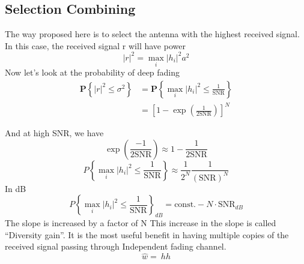\subsection{Selection Combining}
The way proposed here is to select the antenna with the highest received signal.
In this case, the received signal r will have power
\[|r|^2= \max_i{|h_i|^2 a^2}\]
Now let's look at the probability of deep fading
\begin{equation}
    \label{eq:p of deep fading in SIMO}
    \begin{aligned}
        \mathbf{P}\left\{|r|^2 \leq \sigma^2 \right\} &= \mathbf{P}\left\{\max_i{|h_i|^2 \leq \frac{1}{\text{SNR}}}\right\} \\
        & =\left[1- \exp \left( \frac{1}{2\text{SNR}} \right) \right]^N
    \end{aligned}
\end{equation}

And at high SNR, we have 
\[\exp \left( \frac{-1}{2\text{SNR}} \right) \approx 1-\frac{1}{2\text{SNR}}\]
\[P\left\{\max_i{\left|h_i\right|^2\le\frac{1}{\text{SNR}}}\right\}\approx\frac{1}{2^N}\frac{1}{\left(\text{SNR}\right)^N}\]
In dB 
\[P\left\{\max_i{\left|h_i\right|^2\le\frac{1}{\text{SNR}}}\right\}_{dB}= \text{const.} - N \cdot \text{SNR}_{dB}\]
The slope is increased by a factor of N 
This increase in the slope is called “Diversity gain”.
It is the most useful benefit in having multiple copies of the received signal passing through
Independent fading channel.
\[\hat{w}=\ hh\]

